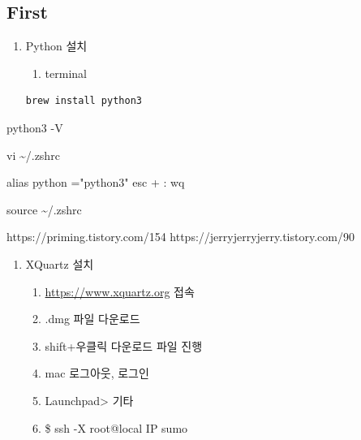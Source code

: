 \documentclass[
  letterpaper,
  DIV=11,
  numbers=noendperiod]{scrreprt}
\newenvironment{Shaded}{\begin{snugshade}}{\end{snugshade}}
\newcommand{\AttributeTok}[1]{\textcolor[rgb]{0.40,0.45,0.13}{#1}}
\newcommand{\BuiltInTok}[1]{\textcolor[rgb]{0.00,0.23,0.31}{#1}}
\newcommand{\ExtensionTok}[1]{\textcolor[rgb]{0.00,0.23,0.31}{#1}}
\newcommand{\FunctionTok}[1]{\textcolor[rgb]{0.28,0.35,0.67}{#1}}
\newcommand{\NormalTok}[1]{\textcolor[rgb]{0.00,0.23,0.31}{#1}}
\providecommand{\tightlist}{%
  \setlength{\itemsep}{0pt}\setlength{\parskip}{0pt}}
\begin{document}
\subsection{First}\label{first}

\begin{enumerate}
\def\labelenumi{\arabic{enumi}.}
\tightlist
\item
  Python 설치

  \begin{enumerate}
  \def\labelenumii{\arabic{enumii}.}
  \tightlist
  \item
    terminal
  \end{enumerate}

\begin{verbatim}
brew install python3       
\end{verbatim}
\end{enumerate}

\begin{Shaded}
\begin{Highlighting}[]
\ExtensionTok{python3} \AttributeTok{{-}V}
\end{Highlighting}
\end{Shaded}

\begin{Shaded}
\begin{Highlighting}[]
\FunctionTok{vi}\NormalTok{ \textasciitilde{}/.zshrc}
\end{Highlighting}
\end{Shaded}

\begin{Shaded}
\begin{Highlighting}[]
\NormalTok{alias python ="python3"}
\NormalTok{esc + : wq}
\end{Highlighting}
\end{Shaded}

\begin{Shaded}
\begin{Highlighting}[]
\BuiltInTok{source}\NormalTok{ \textasciitilde{}/.zshrc}
\end{Highlighting}
\end{Shaded}

https://priming.tistory.com/154 https://jerryjerryjerry.tistory.com/90

\begin{enumerate}
\def\labelenumi{\arabic{enumi}.}
\setcounter{enumi}{1}
\tightlist
\item
  XQuartz 설치

  \begin{enumerate}
  \def\labelenumii{\arabic{enumii}.}
  \tightlist
  \item
    \href{https://www.xquartz.org/}{https://www.xquartz.org} 접속
  \item
    .dmg 파일 다운로드
  \item
    shift+우클릭 다운로드 파일 진행
  \item
    mac 로그아웃, 로그인
  \item
    Launchpad\textgreater{} 기타
  \item
    \$ ssh -X root@local IP sumo
  \end{enumerate}
\end{enumerate}
\end{document}
